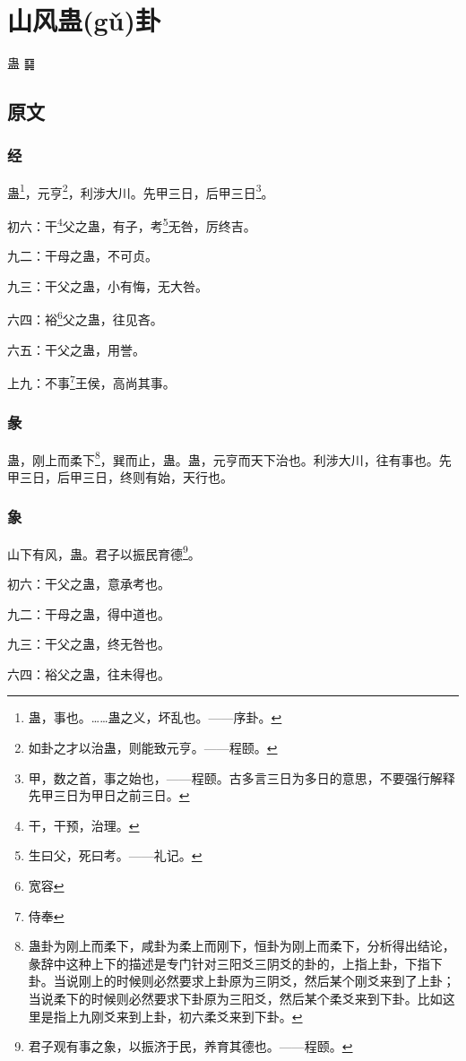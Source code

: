 \documentclass[12pt,oneside]{book}
\begin{document}
\chapter{山风蛊(gǔ)卦}
蛊 {\Large ䷑}

\section{原文}

\subsection{经}
蛊\footnote{蛊，事也。……蛊之义，坏乱也。——序卦。}，元亨\footnote{如卦之才以治蛊，则能致元亨。——程颐。}，利涉大川。先甲三日，后甲三日\footnote{甲，数之首，事之始也，——程颐。古多言三日为多日的意思，不要强行解释先甲三日为甲日之前三日。}。

初六：干\footnote{干，干预，治理。}父之蛊，有子，考\footnote{生曰父，死曰考。——礼记。}无咎，厉终吉。

九二：干母之蛊，不可贞。

九三：干父之蛊，小有悔，无大咎。

六四：裕\footnote{宽容}父之蛊，往见吝。

六五：干父之蛊，用誉。

上九：不事\footnote{侍奉}王侯，高尚其事。

\subsection{彖}
蛊，刚上而柔下\footnote{蛊卦为刚上而柔下，咸卦为柔上而刚下，恒卦为刚上而柔下，分析得出结论，彖辞中这种上下的描述是专门针对三阳爻三阴爻的卦的，上指上卦，下指下卦。当说刚上的时候则必然要求上卦原为三阴爻，然后某个刚爻来到了上卦；当说柔下的时候则必然要求下卦原为三阳爻，然后某个柔爻来到下卦。比如这里是指上九刚爻来到上卦，初六柔爻来到下卦。}，巽而止，蛊。蛊，元亨而天下治也。利涉大川，往有事也。先甲三日，后甲三日，终则有始，天行也。

\subsection{象}
山下有风，蛊。君子以振民育德\footnote{君子观有事之象，以振济于民，养育其德也。——程颐。}。

初六：干父之蛊，意承考也。

九二：干母之蛊，得中道也。

九三：干父之蛊，终无咎也。

六四：裕父之蛊，往未得也。
\end{document}
